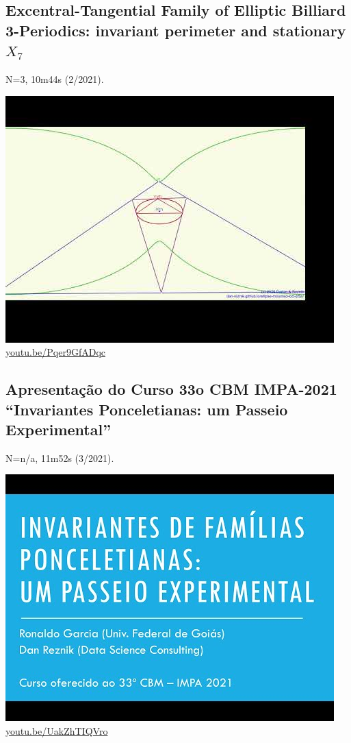 \documentclass[12pt]{amsart}
\begin{document}
\subsection{Excentral-Tangential Family of Elliptic Billiard 3-Periodics: invariant perimeter and stationary $X_{7}$}
\label{vid:Pqer9GfADqc}
\noindent N=3, 10m44s (2/2021). 
\begin{center}\includegraphics[width=.5\textwidth]{pics/Pqer9GfADqc.jpg} \\ 
\href{https://youtu.be/Pqer9GfADqc}{\url{youtu.be/Pqer9GfADqc}}\end{center}
% 

\subsection{Apresentação do Curso 33o CBM IMPA-2021
``Invariantes Ponceletianas: um Passeio Experimental''}
\label{vid:UakZhTIQVro}
\noindent N=n/a, 11m52s (3/2021). 
\begin{center}\includegraphics[width=.5\textwidth]{pics/UakZhTIQVro.jpg} \\ 
\href{https://youtu.be/UakZhTIQVro}{\url{youtu.be/UakZhTIQVro}}\end{center}
% 
\end{document}
